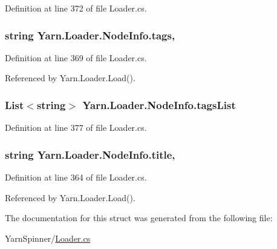 Definition at line 372 of file Loader.\-cs.

\hypertarget{a00134_acd4d4915f6cc14f8b0f1f92d27da8b36}{
\subsubsection[{tags}]{\setlength{\rightskip}{0pt plus 5cm}string Yarn.\-Loader.\-Node\-Info.\-tags\hspace{0.3cm}{\ttfamily [get]}, {\ttfamily [set]}}}\label{a00134_acd4d4915f6cc14f8b0f1f92d27da8b36}


Definition at line 369 of file Loader.\-cs.



Referenced by Yarn.\-Loader.\-Load().

\hypertarget{a00134_ab5010cc4c731e0da871e6002e5fb99a1}{
\subsubsection[{tags\-List}]{\setlength{\rightskip}{0pt plus 5cm}List$<$string$>$ Yarn.\-Loader.\-Node\-Info.\-tags\-List\hspace{0.3cm}{\ttfamily [get]}}}\label{a00134_ab5010cc4c731e0da871e6002e5fb99a1}


Definition at line 377 of file Loader.\-cs.

\hypertarget{a00134_aafc45bbc86a9acb9bdbcf7877695a96c}{
\subsubsection[{title}]{\setlength{\rightskip}{0pt plus 5cm}string Yarn.\-Loader.\-Node\-Info.\-title\hspace{0.3cm}{\ttfamily [get]}, {\ttfamily [set]}}}\label{a00134_aafc45bbc86a9acb9bdbcf7877695a96c}


Definition at line 364 of file Loader.\-cs.



Referenced by Yarn.\-Loader.\-Load().



The documentation for this struct was generated from the following file\-:\begin{DoxyCompactItemize}
\item 
Yarn\-Spinner/\hyperlink{a00300}{Loader.\-cs}\end{DoxyCompactItemize}

